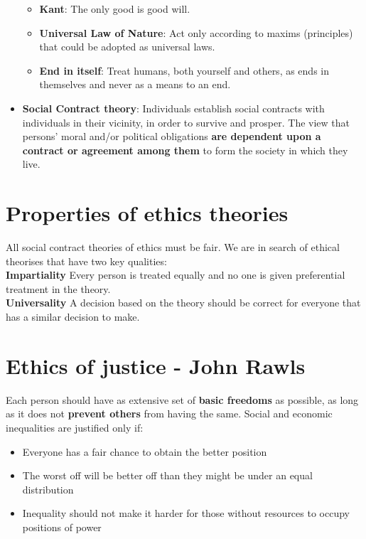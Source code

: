 \documentclass{article}
\begin{document}
\begin{itemize}
  \begin{itemize}
    \item \textbf{Kant}: The only good is good will. 
    \item \textbf{Universal Law of Nature}: Act only according to maxims (principles) that could be adopted as universal laws.
    \item \textbf{End in itself}: Treat humans, both yourself and others, as ends in themselves and never as a means to an end.
  \end{itemize}
  \item \textbf{Social Contract theory}: Individuals establish social contracts with individuals in their vicinity, in order to survive and prosper. The view that persons' moral and/or political obligations \textbf{are dependent upon a contract or agreement among them} to form the society in which they live.
\end{itemize}

\section{Properties of ethics theories}

\begin{flushleft}
All social contract theories of ethics must be fair. We are in search of ethical theorises that have two key qualities:\\
\textbf{Impartiality} Every person is treated equally and no one is given preferential
treatment in the theory.\\
\textbf{Universality} A decision based on the theory should be correct for everyone that has a similar decision to make. 
\end{flushleft}

\section{Ethics of justice - John Rawls}
\begin{flushleft}
Each person should have as extensive set of \textbf{basic freedoms} as possible, as long as it does not \textbf{prevent others} from having the same. Social and economic inequalities are justified only if:
\begin{itemize}
  \item Everyone has a fair chance to obtain the better position 
  \item The worst off will be better off than they might be under an equal distribution
  \item Inequality should not make it harder for those without resources to occupy positions of power
\end{itemize}
\end{flushleft}
\end{document}
